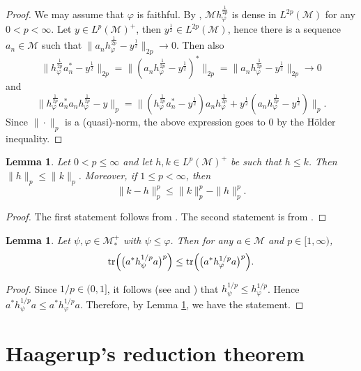 \documentclass[12pt]{article}
\newtheorem{lemma}[theorem]{Lemma}
\theoremstyle{definition}
\theoremstyle{remark}
\numberwithin{equation}{section}
\def\Me{\mathcal M}
\def\Tr{\mathrm{tr}}
\begin{document}
\begin{proof} We may assume that $\varphi$ is faithful. By \cite[Lemma 1.1]{junge2003noncommutative}, $\Me
h_\varphi^{\frac1{2p}}$ is dense in $L^{2p}(\Me)$ for any $0<p<\infty$. Let $y\in L^p(\Me)^+$, then
$y^{\frac12}\in L^{2p}(\Me)$, hence there is a sequence $a_n\in \Me$ such that
$\|a_nh^{\frac1{2p}}_\varphi-y^{\frac12}\|_{2p}\to 0$. Then also 
\[
\Big\|h^{\frac1{2p}}_\varphi a_n^*-y^{\frac12}\Big\|_{2p}
=\Big\|(a_nh^{\frac1{2p}}_\varphi-y^{\frac12})^*\Big\|_{2p}
=\Big\|a_nh^{\frac1{2p}}_\varphi-y^{\frac12}\Big\|_{2p}\to 0
\]
and 
\[
\Big\|h^{\frac1{2p}}_\varphi a_n^*a_nh^{\frac1{2p}}_\varphi-y\Big\|_p
=\Big\|(h^{\frac1{2p}}_\varphi a_n^*-y^{\frac12})a_nh^{\frac1{2p}}_\varphi
+y^{\frac12}(a_nh^{\frac1{2p}}_\varphi-y^{\frac12})\Big\|_p.
\]
Since $\|\cdot\|_p$ is a (quasi)-norm, the above expression goes to 0 by the H\"older
inequality.
\end{proof}


\begin{lemma}\label{lemma:order1}
Let $0<p\le \infty$ and let $h,k\in L^p(\Me)^+$ be such
that $h\le k$. Then 
$\|h\|_p\le \|k\|_p$. Moreover, if $1\le p<\infty$, then 
\[
\|k-h\|_p^p\le \|k\|_p^p-\|h\|_p^p.
\]
\end{lemma}

\begin{proof} The first statement follows from \cite[Lemmas 2.5(iii) and 4.8]{fack1986generalized}.
The second statement is from \cite[Lemma 5.1]{fack1986generalized}.
\end{proof}

\begin{lemma}\label{lemma:order}
Let $\psi,\varphi\in \Me_*^+$ with $\psi\le \varphi$.
Then for any $a\in \Me$ and $p\in [1,\infty)$,
\[
\Tr\Bigl(\bigl(a^*h_\psi^{1/p}a\bigr)^p\Bigr)\le\Tr\Bigl(\bigl(a^*h_\varphi^{1/p}a\bigr)^p\Bigr).
\]
\end{lemma}

\begin{proof} Since $1/p\in (0,1]$, it follows (see \cite[Lemma B.7]{hiai2021quantum} and
\cite[Lemma 3.2]{hiai2021connections}) that $h_\psi^{1/p}\le h_\varphi^{1/p}$.  Hence
$a^*h_\psi^{1/p}a\le a^*h_\varphi^{1/p}a$. Therefore, by Lemma \ref{lemma:order1}, 
we have the statement.
\end{proof}


\section{Haagerup's reduction theorem}\label{Appen-reduction}
\end{document}
